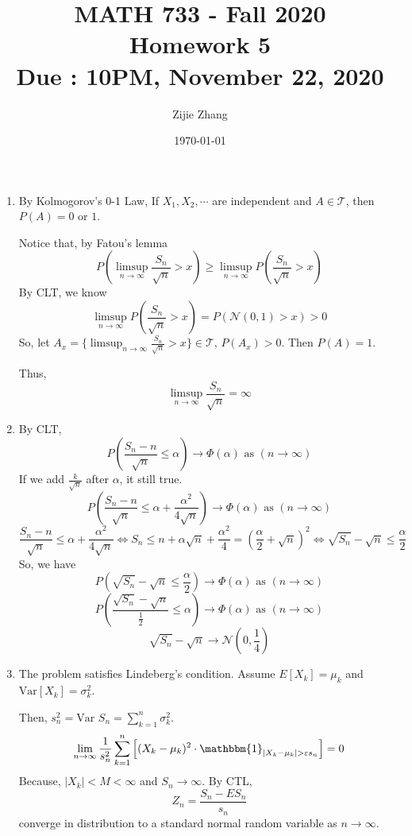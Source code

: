 \documentclass{article}
\title{MATH 733 - Fall 2020\\
		{\Large \textbf{Homework 5}}\\
		{\normalsize \textbf{Due : 10PM, November 22, 2020}}
	}
\author{Zijie Zhang}
\date{\today}
\begin{document}
	\maketitle

	\begin{enumerate}
		\item By Kolmogorov's 0-1 Law, If $X_1, X_2, \cdots$ are independent and $A \in \mathcal{T}$, then $P(A)=0$ or $1$.
		
		Notice that, by Fatou's lemma $$P\left(\limsup_{n\to\infty}\frac{S_n}{\sqrt{n}}>x\right) \geqslant \limsup_{n\to\infty}P\left(\frac{S_n}{\sqrt{n}}>x\right) $$
		By CLT, we know
		$$\limsup_{n\to\infty}P\left(\frac{S_n}{\sqrt{n}}>x\right) = P(\mathcal{N}(0,1)>x)>0$$
		So, let $A_x = \{\limsup_{n\to\infty}\frac{S_n}{\sqrt{n}}>x\} \in \mathcal{T}$, $P(A_x)>0$. Then $P(A)=1$.

		Thus,
		$$\limsup_{n\to\infty}\frac{S_n}{\sqrt{n}} = \infty$$

		\item By CLT,
			$$P\left(\frac{S_n-n}{\sqrt{n}}\leqslant \alpha\right)\to \Phi(\alpha) \text{ as }(n\to \infty)$$
			If we add $\frac{k}{\sqrt{n}}$ after $\alpha$, it still true.
			$$P\left(\frac{S_n-n}{\sqrt{n}}\leqslant \alpha+\frac{\alpha^2}{4\sqrt{n}}\right)\to \Phi(\alpha) \text{ as }(n\to \infty)$$
			$$\frac{S_n-n}{\sqrt{n}}\leqslant \alpha+\frac{\alpha^2}{4\sqrt{n}}
			\Leftrightarrow
			S_n \leqslant n + \alpha \sqrt{n} + \frac{\alpha^2}{4} = \left(\frac{\alpha}{2}+\sqrt{n}\right)^2
			\Leftrightarrow
			\sqrt{S_n} -\sqrt{n} \leqslant \frac{\alpha}{2}$$
			So, we have
			$$P\left(\sqrt{S_n} -\sqrt{n}\leqslant \frac{\alpha}{2}\right)\to \Phi(\alpha) \text{ as }(n\to \infty)$$
			$$P\left(\frac{\sqrt{S_n} -\sqrt{n}}{\frac{1}{2}}\leqslant \alpha\right)\to \Phi(\alpha) \text{ as }(n\to \infty)$$
			$$\sqrt{S_n} -\sqrt{n} \to \mathcal{N}\left(0,\frac{1}{4}\right)$$

		\item The problem satisfies Lindeberg's condition. Assume $E[X_k] = \mu_k$ and $\text{Var}[X_k] = \sigma_k^2$.
		
		Then, $s_n^2 = \text{Var } S_n = \sum_{k=1}^{n}\sigma_k^2$.
		$$\lim_{n\to\infty}\frac{1}{s_n^2}\sum_{k=1}^n\left[(X_k-\mu_k)^2\cdot \mathbbm{1}_{|X_k-\mu_k|>\varepsilon s_n}\right] = 0$$
		Because, $|X_k|<M<\infty$ and $S_n\to \infty$.
		By CTL, $$Z_n = \frac{S_n-ES_n}{s_n}$$ converge in distribution to a standard normal random variable as $n \to \infty$.


\end{enumerate}
\end{document}
